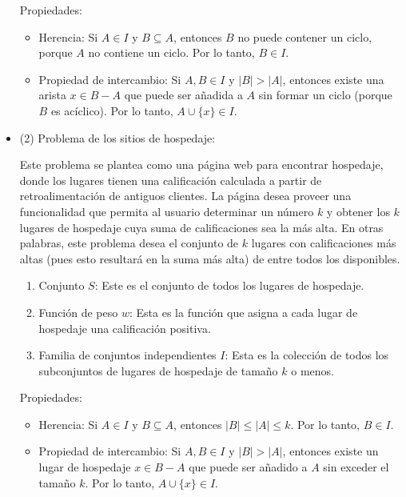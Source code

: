 \begin{problema}
\begin{dem}
\begin{itemize}
\begin{enumerate}
            \end{enumerate}

            Propiedades:
            \begin{itemize}
                \item Herencia: Si $A \in I$ y $B \subseteq A$, entonces $B$ no puede contener un ciclo, porque $A$ no contiene un ciclo. Por lo tanto, $B \in I$.
                \item Propiedad de intercambio: Si $A, B \in I$ y $|B| > |A|$, entonces existe una arista $x \in B - A$ que puede ser añadida a $A$ sin formar un ciclo (porque $B$ es acíclico). Por lo tanto, $A \cup \{x\} \in I$.
            \end{itemize}
            \item (2) Problema de los sitios de hospedaje:
            \begin{cajita}
                Este problema se plantea como una página web para encontrar hospedaje, donde los lugares tienen una calificación calculada a partir de retroalimentación de antiguos clientes. La página desea proveer una funcionalidad que permita al usuario determinar un número $k$ y obtener los $k$ lugares de hospedaje cuya suma de calificaciones sea la más alta. En otras palabras, este problema desea el conjunto de $k$ lugares con calificaciones más altas (pues esto resultará en la suma más alta) de entre todos los disponibles.



            \end{cajita}
            \begin{enumerate}
                \item Conjunto $S$: Este es el conjunto de todos los lugares de hospedaje.
                \item Función de peso $w$: Esta es la función que asigna a cada lugar de hospedaje una calificación positiva.
                \item Familia de conjuntos independientes $I$: Esta es la colección de todos los subconjuntos de lugares de hospedaje de tamaño $k$ o menos.
                
            \end{enumerate}
            
            Propiedades:
            \begin{itemize}
                \item Herencia: Si $A \in I$ y $B \subseteq A$, entonces $|B| \leq |A| \leq k$. Por lo tanto, $B \in I$.
                \item Propiedad de intercambio: Si $A, B \in I$ y $|B| > |A|$, entonces existe un lugar de hospedaje $x \in B - A$ que puede ser añadido a $A$ sin exceder el tamaño $k$. Por lo tanto, $A \cup \{x\} \in I$.
            \end{itemize}
            

\end{itemize}
\end{dem}
\end{problema}
